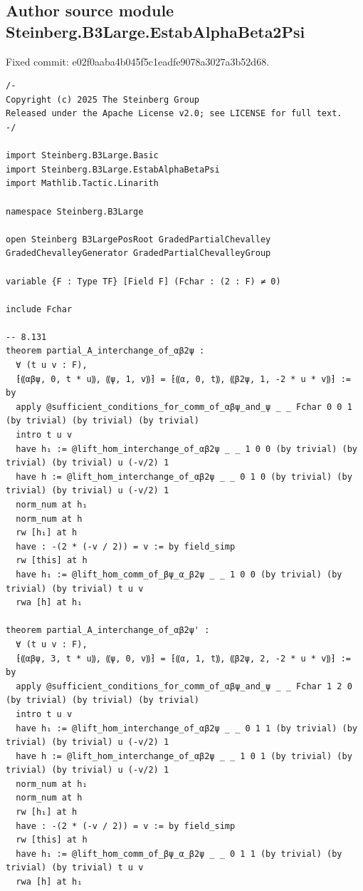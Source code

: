 \subsection*{Author source module Steinberg.B3Large.EstabAlphaBeta2Psi}
\noindent Fixed commit: e02f0aaba4b045f5c1eadfe9078a3027a3b52d68.
\begin{Verbatim}
/-
Copyright (c) 2025 The Steinberg Group
Released under the Apache License v2.0; see LICENSE for full text.
-/

import Steinberg.B3Large.Basic
import Steinberg.B3Large.EstabAlphaBetaPsi
import Mathlib.Tactic.Linarith

namespace Steinberg.B3Large

open Steinberg B3LargePosRoot GradedPartialChevalley GradedChevalleyGenerator GradedPartialChevalleyGroup

variable {F : Type TF} [Field F] (Fchar : (2 : F) ≠ 0)

include Fchar

-- 8.131
theorem partial_A_interchange_of_αβ2ψ :
  ∀ (t u v : F),
  ⁅⸨αβψ, 0, t * u⸩, ⸨ψ, 1, v⸩⁆ = ⁅⸨α, 0, t⸩, ⸨β2ψ, 1, -2 * u * v⸩⁆ := by
  apply @sufficient_conditions_for_comm_of_αβψ_and_ψ _ _ Fchar 0 0 1 (by trivial) (by trivial) (by trivial)
  intro t u v
  have h₁ := @lift_hom_interchange_of_αβ2ψ _ _ 1 0 0 (by trivial) (by trivial) (by trivial) u (-v/2) 1
  have h := @lift_hom_interchange_of_αβ2ψ _ _ 0 1 0 (by trivial) (by trivial) (by trivial) u (-v/2) 1
  norm_num at h₁
  norm_num at h
  rw [h₁] at h
  have : -(2 * (-v / 2)) = v := by field_simp
  rw [this] at h
  have h₁ := @lift_hom_comm_of_βψ_α_β2ψ _ _ 1 0 0 (by trivial) (by trivial) (by trivial) t u v
  rwa [h] at h₁

theorem partial_A_interchange_of_αβ2ψ' :
  ∀ (t u v : F),
  ⁅⸨αβψ, 3, t * u⸩, ⸨ψ, 0, v⸩⁆ = ⁅⸨α, 1, t⸩, ⸨β2ψ, 2, -2 * u * v⸩⁆ := by
  apply @sufficient_conditions_for_comm_of_αβψ_and_ψ _ _ Fchar 1 2 0 (by trivial) (by trivial) (by trivial)
  intro t u v
  have h₁ := @lift_hom_interchange_of_αβ2ψ _ _ 0 1 1 (by trivial) (by trivial) (by trivial) u (-v/2) 1
  have h := @lift_hom_interchange_of_αβ2ψ _ _ 1 0 1 (by trivial) (by trivial) (by trivial) u (-v/2) 1
  norm_num at h₁
  norm_num at h
  rw [h₁] at h
  have : -(2 * (-v / 2)) = v := by field_simp
  rw [this] at h
  have h₁ := @lift_hom_comm_of_βψ_α_β2ψ _ _ 0 1 1 (by trivial) (by trivial) (by trivial) t u v
  rwa [h] at h₁


\end{Verbatim}
